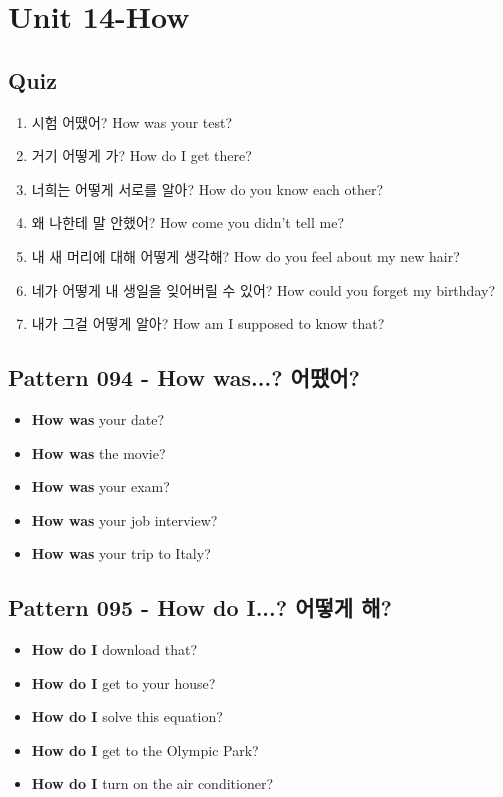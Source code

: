 \documentclass[11pt]{oblivoir}
\begin{document}
\section{Unit 14-How}
\subsection{Quiz}
\begin{enumerate}
  \color{black} \item 시험 어땠어?
    \color{light-gray} How was your test?
  \color{red} \item 거기 어떻게 가?
    \color{light-gray} How do I get there?
  \color{red} \item 너희는 어떻게 서로를 알아?
    \color{light-gray} How do you know each other?
  \color{red} \item 왜 나한테 말 안했어?
    \color{light-gray} How come you didn't tell me?
  \color{red} \item 내 새 머리에 대해 어떻게 생각해?
    \color{light-gray} How do you feel about my new hair?
  \color{black} \item 네가 어떻게 내 생일을 잊어버릴 수 있어?
    \color{light-gray} How could you forget my birthday?
   \color{red} \item 내가 그걸 어떻게 알아?
    \color{light-gray} How am I supposed to know that?
\end{enumerate}

\subsection{Pattern 094 - How was...? \texttildelow 어땠어?}
\begin{itemize}
  \item \textbf{How was} your date?
  \item \textbf{How was} the movie?
  \item \textbf{How was} your exam?
  \item \textbf{How was} your job interview?
  \item \textbf{How was} your trip to Italy?
\end{itemize}

\subsection{Pattern 095 - How do I...? 어떻게 \texttildelow 해?}
\begin{itemize}
  \item \textbf{How do I} download that?
  \item \textbf{How do I} get to your house?
  \item \textbf{How do I} solve this equation?
  \item \textbf{How do I} get to the Olympic Park?
  \item \textbf{How do I} turn on the air conditioner?
\end{itemize}
\end{document}
